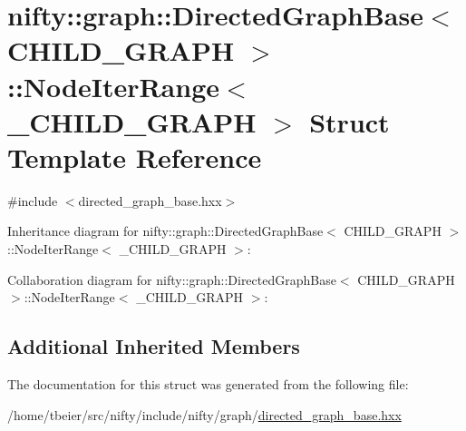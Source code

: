 \hypertarget{structnifty_1_1graph_1_1DirectedGraphBase_1_1NodeIterRange}{}\section{nifty\+:\+:graph\+:\+:Directed\+Graph\+Base$<$ C\+H\+I\+L\+D\+\_\+\+G\+R\+A\+P\+H $>$\+:\+:Node\+Iter\+Range$<$ \+\_\+\+C\+H\+I\+L\+D\+\_\+\+G\+R\+A\+P\+H $>$ Struct Template Reference}
\label{structnifty_1_1graph_1_1DirectedGraphBase_1_1NodeIterRange}


{\ttfamily \#include $<$directed\+\_\+graph\+\_\+base.\+hxx$>$}



Inheritance diagram for nifty\+:\+:graph\+:\+:Directed\+Graph\+Base$<$ C\+H\+I\+L\+D\+\_\+\+G\+R\+A\+P\+H $>$\+:\+:Node\+Iter\+Range$<$ \+\_\+\+C\+H\+I\+L\+D\+\_\+\+G\+R\+A\+P\+H $>$\+:


Collaboration diagram for nifty\+:\+:graph\+:\+:Directed\+Graph\+Base$<$ C\+H\+I\+L\+D\+\_\+\+G\+R\+A\+P\+H $>$\+:\+:Node\+Iter\+Range$<$ \+\_\+\+C\+H\+I\+L\+D\+\_\+\+G\+R\+A\+P\+H $>$\+:
\subsection*{Additional Inherited Members}


The documentation for this struct was generated from the following file\+:\begin{DoxyCompactItemize}
\item 
/home/tbeier/src/nifty/include/nifty/graph/\hyperlink{directed__graph__base_8hxx}{directed\+\_\+graph\+\_\+base.\+hxx}\end{DoxyCompactItemize}
